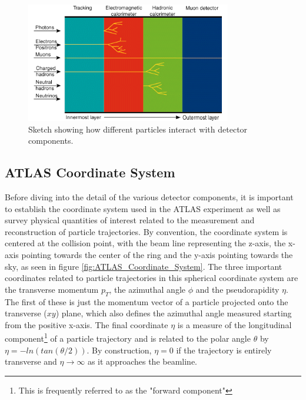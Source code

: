 \begin{figure}
\centering
    \includegraphics[width=0.8\textwidth]{images/Detector_Interactions.png}
    \caption{Sketch showing how different particles interact with detector components.}
    \label{fig:Detector_Interactions}
\end{figure}

\subsection{ATLAS Coordinate System}

Before diving into the detail of the various detector components, it is important to establish the coordinate system 
used in the ATLAS experiment as well as survey physical quantities of interest related to the measurement and 
reconstruction of particle trajectories. By convention, the coordinate system is centered at the collision point, with 
the beam line representing the z-axis, the x-axis pointing towards the center of the ring and the y-axis pointing 
towards the sky, as seen in figure \ref{fig:ATLAS_Coordinate_System}. The three important coordinates related to 
particle trajectories in this spherical coordinate system are the transverse momentum $p_T$, the azimuthal angle $\phi$ 
and the pseudorapidity $\eta$. The first of these is just the momentum vector of a particle projected onto the transverse 
($xy$) plane, which also defines the azimuthal angle measured starting from the positive x-axis. The final coordinate 
$\eta$ is a measure of the longitudinal component\footnote{This is frequently referred to as the "forward component"} 
of a particle trajectory and is related to the polar angle $\theta$ by $\eta = -ln(tan(\theta/2))$. By construction, 
$\eta = 0$ if the trajectory is entirely transverse and $\eta \rightarrow \infty$ as it approaches the beamline.

